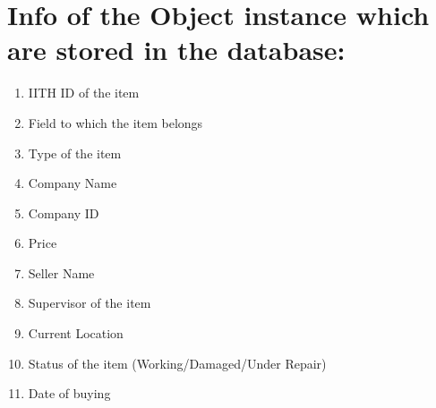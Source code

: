 \documentclass[12pt,a4paper]{article}
\begin{document}
\section*{Info of the Object instance which are stored in the database: }

	\begin{enumerate}
	\item IITH ID of the item 
	\item Field to which the item belongs
	\item Type of the item
	\item Company Name
	\item Company ID
	\item Price
	\item Seller Name
	\item Supervisor of the item
	\item Current Location
	\item Status of the item (Working/Damaged/Under Repair)
	\item Date of buying 
	\end{enumerate}
	
\end{document}
